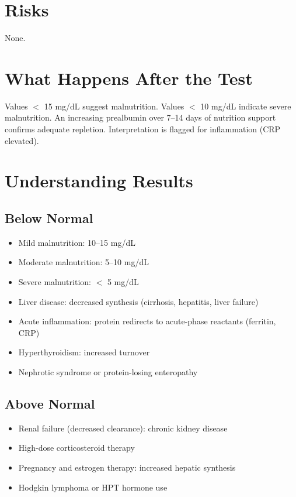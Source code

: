 \section*{Risks}
None.

\section*{What Happens After the Test}
Values $<$ 15 mg/dL suggest malnutrition. Values $<$ 10 mg/dL indicate severe malnutrition. An increasing prealbumin over 7--14 days of nutrition support confirms adequate repletion. Interpretation is flagged for inflammation (CRP elevated).

\section*{Understanding Results}

\subsection*{Below Normal}
\begin{itemize}
  \item Mild malnutrition: 10--15 mg/dL
  \item Moderate malnutrition: 5--10 mg/dL
  \item Severe malnutrition: $<$ 5 mg/dL
  \item Liver disease: decreased synthesis (cirrhosis, hepatitis, liver failure)
  \item Acute inflammation: protein redirects to acute-phase reactants (ferritin, CRP)
  \item Hyperthyroidism: increased turnover
  \item Nephrotic syndrome or protein-losing enteropathy
\end{itemize}

\subsection*{Above Normal}
\begin{itemize}
  \item Renal failure (decreased clearance): chronic kidney disease
  \item High-dose corticosteroid therapy
  \item Pregnancy and estrogen therapy: increased hepatic synthesis
  \item Hodgkin lymphoma or HPT hormone use
\end{itemize}

